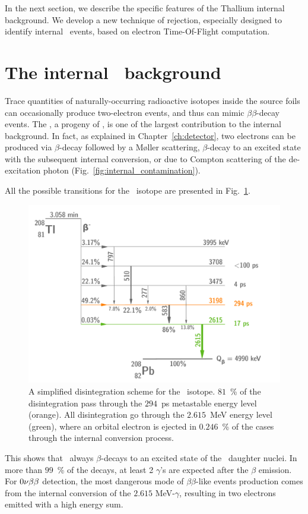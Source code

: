 In the next section, we describe the specific features of the Thallium internal background.
We develop a new technique of rejection, especially designed to identify internal \Tl\ events, based on electron Time-Of-Flight computation.

\section{The internal \Tl\ background}

Trace quantities of naturally-occurring radioactive isotopes inside the source foils can occasionally produce two-electron events, and thus can mimic $\beta\beta$-decay events.
The \Tl, a progeny of \Th, is one of the largest contribution to the internal background.
In fact, as explained in Chapter~\ref{ch:detector}, two electrons can be produced via $\beta$-decay followed by a M\o{}ller scattering, $\beta$-decay to an excited state with the subsequent internal conversion, or due to Compton scattering of the de-excitation photon (Fig.~\ref{fig:internal_contamination}).

All the possible transitions for the \Tl\ isotope are presented in Fig.~\ref{fig:Tl_scheme}.
\begin{figure}
  \centering
  \includegraphics[width=13cm]{timedifference/fig_timediff/Tl_decay_scheme.pdf}
  \caption{A simplified disintegration scheme for the \Tl\ isotope.
    $81$~\% of the disintegration pass through the $294$~ps metastable energy level (orange).
    All disintegration go through the $2.615$~MeV energy level (green), where an orbital electron is ejected in $0.246$~\% of the cases through the internal conversion process.
  \label{fig:Tl_scheme}}
\end{figure}
This shows that \Tl\ always $\beta$-decays to an excited state of the \Pb\ daughter nuclei.
In more than $99$~\% of the decays, at least 2 $\gamma$'s are expected after the $\beta$ emission.
For $0\nu\beta\beta$ detection, the most dangerous mode of $\beta\beta$-like events production comes from the internal conversion of the $2.615$ MeV-$\gamma$, resulting in two electrons emitted with a high energy sum.

